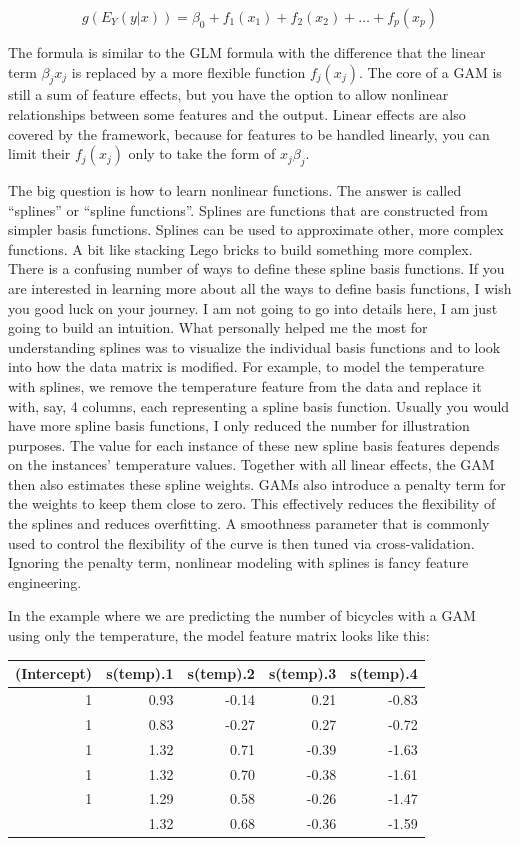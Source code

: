\documentclass[
  11pt,
]{scrbook}
\begin{document}
\[g(E_Y(y|x))=\beta_0+f_1(x_{1})+f_2(x_{2})+\ldots+f_p(x_{p})\]

The formula is similar to the GLM formula with the difference that the linear term \(\beta_j{}x_{j}\) is replaced by a more flexible function \(f_j(x_{j})\).
The core of a GAM is still a sum of feature effects, but you have the option to allow nonlinear relationships between some features and the output.
Linear effects are also covered by the framework, because for features to be handled linearly, you can limit their \(f_j(x_{j})\) only to take the form of \(x_{j}\beta_j\).

The big question is how to learn nonlinear functions.
The answer is called ``splines'' or ``spline functions''.
Splines are functions that are constructed from simpler basis functions.
Splines can be used to approximate other, more complex functions.
A bit like stacking Lego bricks to build something more complex.
There is a confusing number of ways to define these spline basis functions.
If you are interested in learning more about all the ways to define basis functions, I wish you good luck on your journey.
I am not going to go into details here, I am just going to build an intuition.
What personally helped me the most for understanding splines was to visualize the individual basis functions and to look into how the data matrix is modified.
For example, to model the temperature with splines, we remove the temperature feature from the data and replace it with, say, 4 columns, each representing a spline basis function.
Usually you would have more spline basis functions, I only reduced the number for illustration purposes.
The value for each instance of these new spline basis features depends on the instances' temperature values.
Together with all linear effects, the GAM then also estimates these spline weights.
GAMs also introduce a penalty term for the weights to keep them close to zero.
This effectively reduces the flexibility of the splines and reduces overfitting.
A smoothness parameter that is commonly used to control the flexibility of the curve is then tuned via cross-validation.
Ignoring the penalty term, nonlinear modeling with splines is fancy feature engineering.

In the example where we are predicting the number of bicycles with a GAM using only the temperature, the model feature matrix looks like this:

\begin{table}
\centering
\begin{tabular}{rrrrr}
\toprule
(Intercept) & s(temp).1 & s(temp).2 & s(temp).3 & s(temp).4\\
\midrule
1 & 0.93 & -0.14 & 0.21 & -0.83\\
1 & 0.83 & -0.27 & 0.27 & -0.72\\
1 & 1.32 & 0.71 & -0.39 & -1.63\\
1 & 1.32 & 0.70 & -0.38 & -1.61\\
1 & 1.29 & 0.58 & -0.26 & -1.47\\
\addlinespace
1 & 1.32 & 0.68 & -0.36 & -1.59\\
\bottomrule
\end{tabular}
\end{table}
\end{document}
